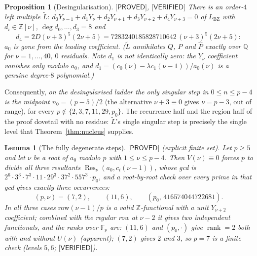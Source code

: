 \documentclass[11pt,reqno]{amsart}
\theoremstyle{plain}
\newtheorem{proposition}[theorem]{Proposition}
\newtheorem{lemma}[theorem]{Lemma}
\theoremstyle{definition}
\theoremstyle{remark}
\numberwithin{equation}{section}
\newcommand{\ZZ}{\mathbb{Z}}
\newcommand{\QQ}{\mathbb{Q}}
\newcommand{\FF}{\mathbb{F}}
\newcommand{\rank}{\operatorname{rank}}
\newcommand{\Res}{\operatorname{Res}}
\newcommand{\LBZ}{L_{\mathrm{BZ}}}
\newcommand{\PROVED}{\textsf{[PROVED]}}
\newcommand{\VERIFIED}{\textsf{[VERIFIED]}}
\begin{document}
\begin{proposition}[Desingularisation]\label{prop:Ltilde}
$\PROVED$, $\VERIFIED$ There is an order-$4$ left multiple
$\tilde L:\ d_0Y_{\nu-1}+d_1Y_\nu+d_2Y_{\nu+1}+d_3Y_{\nu+2}+d_4Y_{\nu+3}=0$ of $\LBZ$ with
$d_i\in\ZZ[\nu]$, $\deg d_0,\dots,d_3=8$ and
\[
d_4=2D(\nu+3)^5(2\nu+5)=7283240185828710642\,(\nu+3)^5(2\nu+5):
\]
$a_0$ is gone from the leading coefficient. ($\tilde L$ annihilates $Q$, $P$ and $\hat P$
exactly over $\QQ$ for $\nu=1,\dots,40$, $0$ residuals. Note $d_1$ is not identically zero: the
$Y_\nu$ coefficient vanishes only modulo $a_0$, and
$d_1=(c_0(\nu)-\lambda c_1(\nu-1))/a_0(\nu)$ is a genuine degree-$8$ polynomial.)
\end{proposition}

Consequently, \emph{on the desingularised ladder the only singular step in $0\le n\le p-4$ is
the midpoint $n_0=(p-5)/2$} (the alternative $\nu+3\equiv0$ gives $\nu=p-3$, out of range), for
every $p\notin\{2,3,7,11,29,p_0\}$. The recurrence half and the
region half of the proof dovetail with no residue: $\tilde L$'s single singular step is
precisely the single level that Theorem~\ref{thm:nucleus} supplies.

\begin{lemma}[The fully degenerate steps]\label{lem:degen}
$\PROVED$ (explicit finite set). Let $p\ge5$ and let $\nu$ be a root of $a_0$ modulo $p$ with
$1\le\nu\le p-4$. Then $V(\nu)\equiv0$ forces $p$ to divide all
three resultants $\Res_\nu(a_0,c_i(\nu-1))$, whose gcd is
$2^6\cdot3^3\cdot7^3\cdot11\cdot29^3\cdot37^2\cdot557^3\cdot p_0$, and a root-by-root check over
every prime in that gcd gives exactly three occurrences:
\[
(p,\nu)=(7,2),\qquad (11,6),\qquad (p_0,\,416574044722681).
\]
In all three cases
$\mathrm{row}(\nu-1)/p$ is a valid $\ZZ$-functional with a unit $Y_{\nu+2}$ coefficient;
combined with the regular row at $\nu-2$ it gives two independent functionals, and the ranks
over $\FF_p$ are: $(11,6)$ and $(p_0,\cdot)$ give $\rank=2$ both with and without $U(\nu)$
\emph{(apparent)}; $(7,2)$ gives $2$ and $3$, so $p=7$ is a finite check (levels $5,6$;
$\VERIFIED$).
\end{lemma}
\end{document}
